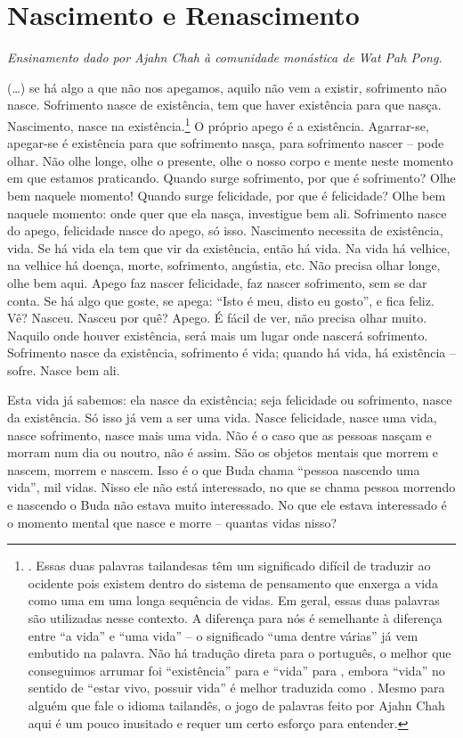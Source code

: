 
\chapter{Nascimento e Renascimento}

{\itshape
Ensinamento dado por Ajahn Chah à comunidade monástica de Wat Pah Pong.}

(…) se há algo a que não nos apegamos, aquilo não vem a existir,
sofrimento não nasce. Sofrimento nasce de existência, tem que haver
existência para que nasça. Nascimento, nasce na
existência.\footnote{. Essas duas
palavras tailandesas têm um significado difícil de traduzir ao ocidente
pois existem dentro do sistema de pensamento que enxerga a vida como
uma em uma longa sequência de vidas. Em geral, essas duas palavras são
utilizadas nesse contexto. A diferença para nós é semelhante à
diferença entre “a vida” e “uma vida” -- o significado “uma dentre
várias” já vem embutido na palavra. Não há tradução direta para o
português, o melhor que conseguimos arrumar foi “existência” para
 e “vida” para , embora “vida” no
sentido de “estar vivo, possuir vida” é melhor traduzida como
. Mesmo para alguém que fale o idioma
tailandês, o jogo de palavras feito por Ajahn Chah aqui é um pouco
inusitado e requer um certo esforço para entender.} O próprio apego é
a existência. Agarrar-se, apegar-se é existência para que sofrimento
nasça, para sofrimento nascer – pode olhar. Não olhe longe, olhe o
presente, olhe o nosso corpo e mente neste momento em que estamos
praticando. Quando surge sofrimento, por que é sofrimento? Olhe bem
naquele momento! Quando surge felicidade, por que é felicidade? Olhe
bem naquele momento: onde quer que ela nasça, investigue bem ali.
Sofrimento nasce do apego, felicidade nasce do apego, só isso.
Nascimento necessita de existência, vida. Se há vida ela tem que vir da
existência, então há vida. Na vida há velhice, na velhice há doença,
morte, sofrimento, angústia, etc. Não precisa olhar longe, olhe bem
aqui. Apego faz nascer felicidade, faz nascer sofrimento, sem se dar
conta. Se há algo que goste, se apega: “Isto é meu, disto eu gosto”, e
fica feliz. Vê? Nasceu. Nasceu por quê? Apego. É fácil de ver, não
precisa olhar muito. Naquilo onde houver existência, será mais um lugar
onde nascerá sofrimento. Sofrimento nasce da existência, sofrimento é
vida; quando há vida, há existência – sofre. Nasce bem ali. 

Esta vida já sabemos: ela nasce da existência; seja felicidade ou
sofrimento, nasce da existência. Só isso já vem a ser uma vida. Nasce
felicidade, nasce uma vida, nasce sofrimento, nasce mais uma vida. Não
é o caso que as pessoas nasçam e morram num dia ou noutro, não é assim.
São os objetos mentais que morrem e nascem, morrem e nascem. Isso é o
que Buda chama “pessoa nascendo uma vida”, mil vidas. Nisso ele não
está interessado, no que se chama pessoa morrendo e nascendo o Buda não
estava muito interessado. No que ele estava interessado é o momento
mental que nasce e morre – quantas vidas nisso? 

